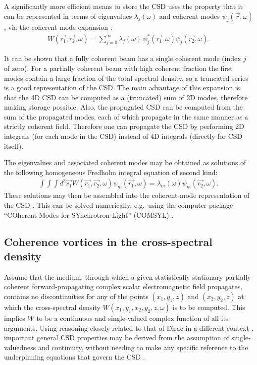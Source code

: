 \documentclass[%
 reprint,
 amsmath,amssymb,
 aps,
]{revtex4-1}
\begin{document}
A significantly more efficient means to store the CSD uses the property that it can be represented in terms of eigenvalues $\lambda_j(\omega)$ and coherent modes $\psi_j(\vec{r}, \omega)$, via the coherent-mode expansion
\cite{Wolf1982,mandel_wolf}:
\begin{equation}
\begin{aligned}
W(\vec{r_1}, \vec{r_2}, \omega)
=
\sum_{j=0}^{\infty}
\lambda_j(\omega) \,
\psi_j^*(\vec{r_1},\omega)
\psi_j(\vec{r_2}, \omega).
\end{aligned}\label{eq:CoherentModeExpansion}
\end{equation}

It can be shown that a fully coherent beam has a single coherent mode (index $j$ of zero). For a partially coherent beam with high coherent fraction the first modes contain a large fraction of the total spectral density, so a truncated series is a good representation of the CSD. The main advantage of this expansion is that the 4D CSD can be computed as a (truncated) sum of 2D modes, therefore making storage possible. Also, the propagated CSD can be computed from the sum of the propagated modes, each of which propagate in the same manner as a strictly coherent field.  Therefore one can propagate the CSD by performing 2D integrals (for each mode in the CSD) instead of 4D integrals (directly for CSD itself).  

The eigenvalues and associated coherent modes may be obtained as solutions of the following homogeneous Fredholm integral equation of second kind:
\begin{equation}
\begin{aligned}
\label{fredholm_equation}
\int \!\!\! \int \!\!\! \int d^3\vec{r_1}
W(\vec{r_1},\vec{r_2}, \omega){\psi}_m(\vec{r_1},
\omega)=\lambda_m(\omega)\psi_m(\vec{r_2}, \omega).
\end{aligned}
\end{equation}
These solutions may then be assembled into the coherent-mode representation of the CSD \cite{Wolf1982}.  This can be solved numerically, e.g.~using the computer package ``COherent Modes for SYnchrotron Light'' (COMSYL) \cite{glass}.

\subsection{Coherence vortices in the cross-spectral density}

Assume that the medium, through which a given statistically-stationary partially coherent forward-propagating complex scalar electromagnetic field propagates, contains no discontinuities for any of the points $(x_1,y_1,z)$ and $(x_2,y_2,z)$ at which the cross-spectral density $W(x_1,y_1,x_2,y_2,z,\omega)$ is to be computed. This implies $W$ to be a continuous and single-valued complex function of all its arguments.  Using reasoning closely related to that of Dirac in a different context \cite{Dirac1931}, important general CSD properties may be derived from the assumption of single-valuedness and continuity, without needing to make any specific reference to the underpinning  equations that govern the CSD \cite{Marasinghe2010}. 
\end{document}
